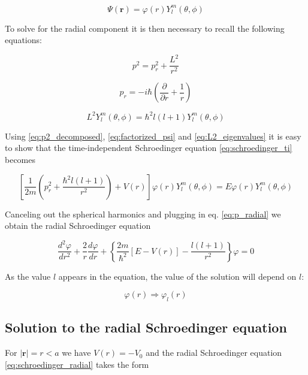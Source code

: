 \documentclass{article}
\begin{document}
\begin{equation}
\label{eq:factorized_psi}
\Psi(\bm{r}) = \varphi(r) Y_{l}^m(\theta,\phi)
\end{equation}

To solve for the radial component it is then necessary to recall the following equations:

\begin{equation}
\label{eq:p2_decomposed}
p^2 = p_{r}^2 + \frac{L^2}{r^2}
\end{equation}

\begin{equation}
\label{eq:p_radial}
p_{r} = -i\hbar \left( \frac{\partial}{\partial r} + \frac{1}{r} \right)
\end{equation}

\begin{equation}
\label{eq:L2_eigenvalues}
L^2 Y_{l}^m(\theta, \phi) = \hbar^2 l(l+1) Y_{l}^m(\theta, \phi)
\end{equation}

Using \eqref{eq:p2_decomposed}, \eqref{eq:factorized_psi} and \eqref{eq:L2_eigenvalues} 
it is easy to show that the time-independent Schroedinger equation \eqref{eq:schroedinger_ti} becomes

\begin{equation}
\left[ \frac{1}{2m} \left( p_{r}^2 + \frac{\hbar^2 l(l+1)}{r^2} \right) + V(r) \right] \varphi(r) Y_{l}^m(\theta, \phi) = E \varphi(r) Y_{l}^m(\theta, \phi)
\end{equation}

Canceling out the spherical harmonics and plugging in eq. \eqref{eq:p_radial} we obtain the radial Schroedinger equation

\begin{equation}
\label{eq:schroedinger_radial}
\frac{d^2 \varphi}{dr^2} + \frac{2}{r} \frac{d\varphi}{dr} + \left\{ \frac{2m}{\hbar^2} \left[ E - V(r) \right] - \frac{l \left(l+1 \right)}{r^2} \right\} \varphi = 0
\end{equation}

As the value \(l\) appears in the equation, the value of the solution will depend on \(l\):

\[ \varphi(r) \Rightarrow \varphi_l(r) \]

\subsection{Solution to the radial Schroedinger equation}
For \( \left| \bm{r} \right| = r < a \) we have \( V(r) = -V_0 \) and the radial Schroedinger equation \eqref{eq:schroedinger_radial} takes the form
\end{document}
